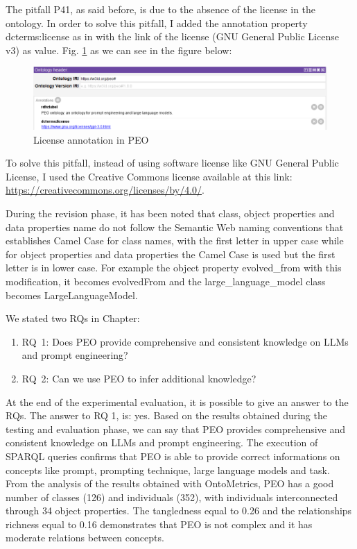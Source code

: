 The pitfall P41, as said before, is due to the absence of the license in the ontology.
In order to solve this pitfall, I added the annotation property dcterms:license  as in \cite{yusof2019malaysian} with the link of the license (GNU General Public License v3) as value. Fig. \ref{fig:79} as we can see in the figure below:
\begin{figure}[H]
    \centering
    \includegraphics[width=0.9\linewidth]{Figures/fig_79.png}
    \caption{License annotation in PEO}
    \label{fig:79}
\end{figure}
To solve this pitfall, instead of using software license like GNU General Public License, I used the Creative Commons license available at this link: \href{https://creativecommons.org/licenses/by/4.0/}{https://creativecommons.org/licenses/by/4.0/}.

During the revision phase, it has been noted that class, object properties and data properties name do not follow the Semantic Web naming conventions that establishes Camel Case for class names, with the first letter in upper case while for object properties and data properties the Camel Case is used but the first letter is in lower case.
For example the object property evolved\_from with this modification, it becomes evolvedFrom and the large\_language\_model class becomes LargeLanguageModel.


We stated two RQs in Chapter:
\begin{enumerate}
      \item RQ~1: Does PEO provide comprehensive and consistent knowledge on LLMs and prompt engineering?

    \item RQ~2: Can we use PEO to infer additional knowledge?
\end{enumerate}

At the end of the experimental evaluation, it is possible to give an answer to the RQs.
The answer to RQ 1, is: yes.
Based on the results obtained during the testing and evaluation phase, we can say that PEO provides comprehensive and consistent knowledge on LLMs and prompt engineering. The execution of SPARQL queries confirms that PEO is able to provide correct informations on concepts like prompt, prompting technique, large language models and task. From the analysis of the results obtained with OntoMetrics, PEO has a good number of classes (126) and individuals (352), with individuals interconnected through 34 object properties. The tangledness equal to 0.26 and the relationships richness equal to 0.16 demonstrates that PEO is not complex and it has moderate relations between concepts.

